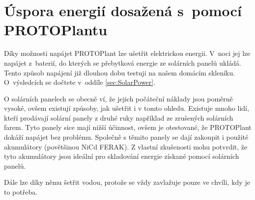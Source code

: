 \chapter{Úspora energií dosažená s~pomocí PROTOPlantu}
Díky možnosti napájet PROTOPlant  lze ušetřit elektrickou energii. 
V~noci jej lze napájet z~baterií, do kterých se přebytková energie ze solárních panelů ukládá.
Tento způsob napájení již dlouhou dobu testuji na našem domácím skleníku. 
O~výsledcích se dočtete v~oddíle \ref{sec:SolarPower}.

O solárních panelech se obecně ví, že jejich počáteční náklady jsou poměrně vysoké, ovšem existují způsoby, jak ušetřit i v tomto ohledu.
Existuje mnoho lidí, kteří prodávají solární panely z druhé ruky například ze zrušených solárních farem.
Tyto panely sice mají nižší účinnost, ovšem je otestované, že PROTOPlant dokáží napájet bez problému.
Společně s těmito panely se dají zakoupit i použité akumulátory (povětšinou NiCd FERAK).
Z vlastní zkušenosti mohu potvrdit, že tyto akumulátory jsou ideální pro skladování energie získané pomocí solárních panelů.

Dále lze díky němu šetřit vodou, protože se vždy zavlažuje pouze ve chvíli, kdy je to potřeba.

\newpage